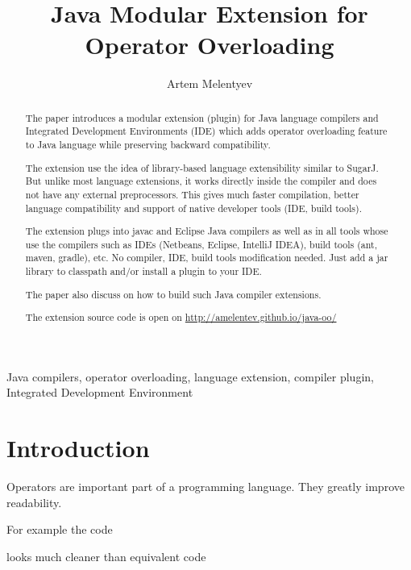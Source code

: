 \documentclass{aircc}
\begin{document}
\title{
Java Modular Extension for \\ 
Operator Overloading
}

\author{Artem Melentyev}

\maketitle

\begin{abstract}
The paper introduces a modular extension (plugin) for Java language compilers and Integrated Development Environments (IDE)
which adds operator overloading feature to Java language while preserving backward compatibility.

The extension use the idea of library-based language extensibility similar to SugarJ\cite{sugarj}.
But unlike most language extensions, it works directly inside the compiler and does not have any external preprocessors.
This gives much faster compilation, better language compatibility and
support of native developer tools (IDE, build tools).

The extension plugs into javac and Eclipse Java compilers 
as well as in all tools whose use the compilers such as IDEs (Netbeans, Eclipse, IntelliJ IDEA), build tools (ant, maven, gradle), etc.
No compiler, IDE, build tools modification needed. Just add a jar library to classpath and/or install a plugin to your IDE.

The paper also discuss on how to build such Java compiler extensions.

The extension source code is open on 
\url{http://amelentev.github.io/java-oo/}
\end{abstract}

\begin{keywords}
Java compilers, operator overloading, language extension, compiler plugin, Integrated Development Environment
\end{keywords}

\section{Introduction}
Operators are important part of a programming language.
They greatly improve readability.

For example the code

looks much cleaner than equivalent code
\end{document}
